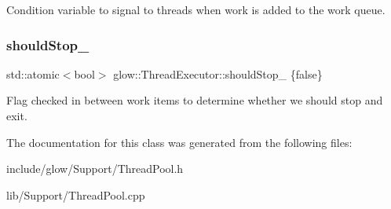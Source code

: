Condition variable to signal to threads when work is added to the work queue. \mbox{\label{classglow_1_1_thread_executor_a88d31feb58f5b19d6a6892b55a80f102}} 
\subsubsection{\texorpdfstring{should\+Stop\+\_\+}{shouldStop\_}}
{\footnotesize\ttfamily std\+::atomic$<$bool$>$ glow\+::\+Thread\+Executor\+::should\+Stop\+\_\+ \{false\}\hspace{0.3cm}{\ttfamily [protected]}}

Flag checked in between work items to determine whether we should stop and exit. 

The documentation for this class was generated from the following files\+:\begin{DoxyCompactItemize}
\item 
include/glow/\+Support/Thread\+Pool.\+h\item 
lib/\+Support/Thread\+Pool.\+cpp\end{DoxyCompactItemize}
